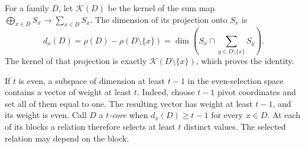 For a family $D$, let $\mathcal K(D)$ be the kernel of the sum map
$\bigoplus_{x\in D}S_x\to\sum_{x\in D}S_x$. The dimension of its
projection onto $S_x$ is
\begin{equation}
 d_x(D)=\rho(D)-\rho(D\setminus\{x\})
       =\dim\left(S_x\cap\sum_{y\in D\setminus\{x\}}S_y\right).
 \label{p1:core:projection-dimension}
\end{equation}
The kernel of that projection is exactly
$\mathcal K(D\setminus\{x\})$, which proves the identity.

If $t$ is even, a subspace of dimension at least $t-1$ in the
even-selection space contains a vector of weight at least $t$.
Indeed, choose $t-1$ pivot coordinates and set all of them equal to
one. The resulting vector has weight at least $t-1$, and its weight
is even. Call $D$ a \emph{$t$-core} when $d_x(D)\ge t-1$ for every
$x\in D$. At each of its blocks a relation therefore selects at least
$t$ distinct values. The selected relation may depend on the block.

